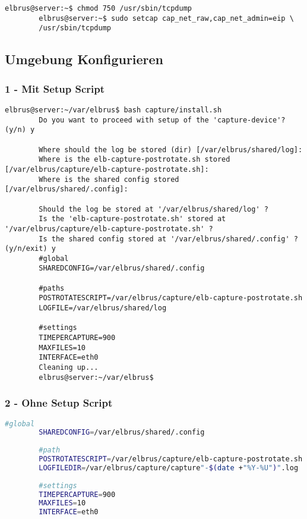 \documentclass{article}
\begin{document}
	\begin{lstlisting}[caption={Ändern der Berechtigungen auf 'tcpdump'.}]
		elbrus@server:~$ chmod 750 /usr/sbin/tcpdump
		elbrus@server:~$ sudo setcap cap_net_raw,cap_net_admin=eip \
		/usr/sbin/tcpdump
	\end{lstlisting}
	
	\newpage
	\subsection[file config]{Umgebung Konfigurieren}
	\subsubsection{1 - Mit Setup Script}
	\begin{lstlisting}[caption={Ausführen des 'install.sh' Scripts.}, breaklines=true,]
		elbrus@server:~/var/elbrus$ bash capture/install.sh
		Do you want to proceed with setup of the 'capture-device'? (y/n) y
		
		Where should the log be stored (dir) [/var/elbrus/shared/log]:
		Where is the elb-capture-postrotate.sh stored [/var/elbrus/capture/elb-capture-postrotate.sh]:
		Where is the shared config stored [/var/elbrus/shared/.config]:
		
		Should the log be stored at '/var/elbrus/shared/log' ?
		Is the 'elb-capture-postrotate.sh' stored at '/var/elbrus/capture/elb-capture-postrotate.sh' ?
		Is the shared config stored at '/var/elbrus/shared/.config' ? (y/n/exit) y
		#global
		SHAREDCONFIG=/var/elbrus/shared/.config
		
		#paths
		POSTROTATESCRIPT=/var/elbrus/capture/elb-capture-postrotate.sh
		LOGFILE=/var/elbrus/shared/log
		
		#settings
		TIMEPERCAPTURE=900
		MAXFILES=10
		INTERFACE=eth0
		Cleaning up...
		elbrus@server:~/var/elbrus$
	\end{lstlisting}
	
	\subsubsection{2 - Ohne Setup Script}
	\lstset{style=files}
	\begin{lstlisting}[caption={Anhand von '.env.example' eigene '.env' Datei anlegen.}, language=bash]
		#global
		SHAREDCONFIG=/var/elbrus/shared/.config
		
		#path
		POSTROTATESCRIPT=/var/elbrus/capture/elb-capture-postrotate.sh
		LOGFILEDIR=/var/elbrus/capture/capture"-$(date +"%Y-%U")".log
		
		#settings
		TIMEPERCAPTURE=900
		MAXFILES=10
		INTERFACE=eth0
	\end{lstlisting}
\end{document}
